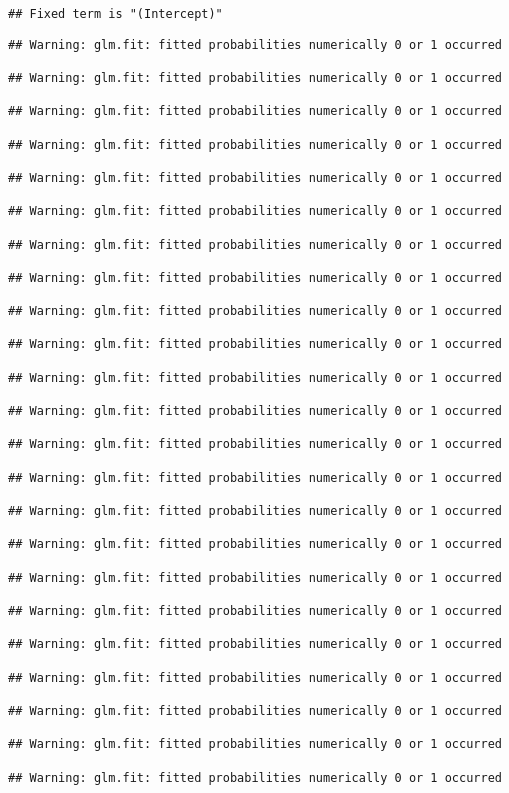 \documentclass[
]{article}
\begin{document}
\begin{verbatim}
## Fixed term is "(Intercept)"
\end{verbatim}

\begin{verbatim}
## Warning: glm.fit: fitted probabilities numerically 0 or 1 occurred

## Warning: glm.fit: fitted probabilities numerically 0 or 1 occurred

## Warning: glm.fit: fitted probabilities numerically 0 or 1 occurred

## Warning: glm.fit: fitted probabilities numerically 0 or 1 occurred

## Warning: glm.fit: fitted probabilities numerically 0 or 1 occurred

## Warning: glm.fit: fitted probabilities numerically 0 or 1 occurred

## Warning: glm.fit: fitted probabilities numerically 0 or 1 occurred

## Warning: glm.fit: fitted probabilities numerically 0 or 1 occurred

## Warning: glm.fit: fitted probabilities numerically 0 or 1 occurred

## Warning: glm.fit: fitted probabilities numerically 0 or 1 occurred

## Warning: glm.fit: fitted probabilities numerically 0 or 1 occurred

## Warning: glm.fit: fitted probabilities numerically 0 or 1 occurred

## Warning: glm.fit: fitted probabilities numerically 0 or 1 occurred

## Warning: glm.fit: fitted probabilities numerically 0 or 1 occurred

## Warning: glm.fit: fitted probabilities numerically 0 or 1 occurred

## Warning: glm.fit: fitted probabilities numerically 0 or 1 occurred

## Warning: glm.fit: fitted probabilities numerically 0 or 1 occurred

## Warning: glm.fit: fitted probabilities numerically 0 or 1 occurred

## Warning: glm.fit: fitted probabilities numerically 0 or 1 occurred

## Warning: glm.fit: fitted probabilities numerically 0 or 1 occurred

## Warning: glm.fit: fitted probabilities numerically 0 or 1 occurred

## Warning: glm.fit: fitted probabilities numerically 0 or 1 occurred

## Warning: glm.fit: fitted probabilities numerically 0 or 1 occurred
\end{verbatim}
\end{document}
